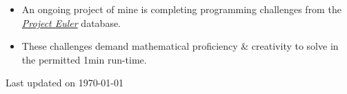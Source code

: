 \documentclass[10pt,a4paper,ragged2e,withhyper]{altacv}
\newcommand{\updateinfo}[1][\today]{\par\vfill\hfill{\scriptsize\color{LightGrey}Last updated on #1}}
\begin{document}
\begin{paracol}{2}
\begin{itemize}
	\item An ongoing project of mine is completing programming challenges from the
	\href{https://projecteuler.net/about}{\emph{Project Euler}} database.
	\item These challenges demand mathematical proficiency \& creativity to solve in the permitted 1min run-time.
\end{itemize}

%
\end{paracol}
\updateinfo
\end{document}
